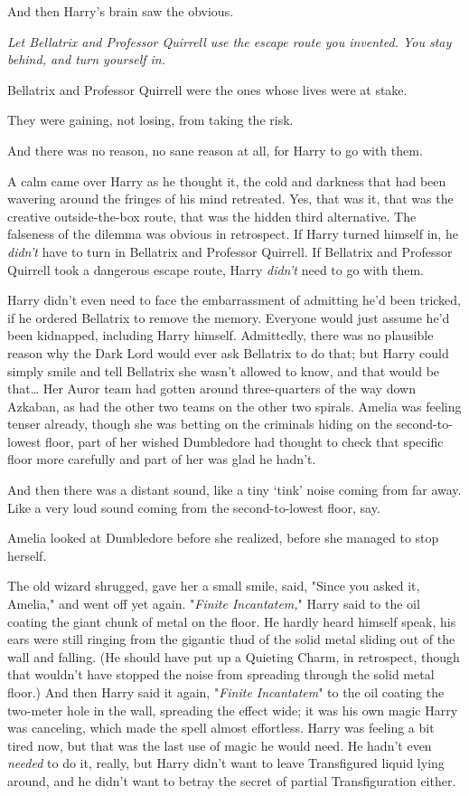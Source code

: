 And then Harry's brain saw the obvious.

\emph{Let Bellatrix and Professor Quirrell use the escape route you invented.
You stay behind, and turn yourself in.}

Bellatrix and Professor Quirrell were the ones whose lives were at stake.

They were gaining, not losing, from taking the risk.

And there was no reason, no sane reason at all, for Harry to go with them.

A calm came over Harry as he thought it, the cold and darkness that had been
wavering around the fringes of his mind retreated. Yes, that was it, that was
the creative outside-the-box route, that was the hidden third alternative. The
falseness of the dilemma was obvious in retrospect. If Harry turned himself in,
he \emph{didn't} have to turn in Bellatrix and Professor Quirrell. If Bellatrix
and Professor Quirrell took a dangerous escape route, Harry \emph{didn't} need
to go with them.

Harry didn't even need to face the embarrassment of admitting he'd been
tricked, if he ordered Bellatrix to remove the memory. Everyone would just
assume he'd been kidnapped, including Harry himself. Admittedly, there was no
plausible reason why the Dark Lord would ever ask Bellatrix to do that; but
Harry could simply smile and tell Bellatrix she wasn't allowed to know, and
that would be that{\ldots}
\later
Her Auror team had gotten around three-quarters of the way down Azkaban, as had
the other two teams on the other two spirals. Amelia was feeling tenser
already, though she was betting on the criminals hiding on the second-to-lowest
floor, part of her wished Dumbledore had thought to check that specific floor
more carefully and part of her was glad he hadn't.

And then there was a distant sound, like a tiny `tink' noise coming from far
away. Like a very loud sound coming from the second-to-lowest floor, say.

Amelia looked at Dumbledore before she realized, before she managed to stop
herself.

The old wizard shrugged, gave her a small smile, said, "Since you asked it,
Amelia," and went off yet again.
\later
"\emph{Finite Incantatem,}" Harry said to the oil coating the giant chunk of
metal on the floor. He hardly heard himself speak, his ears were still ringing
from the gigantic thud of the solid metal sliding out of the wall and falling.
(He should have put up a Quieting Charm, in retrospect, though that wouldn't
have stopped the noise from spreading through the solid metal floor.) And then
Harry said it again, "\emph{Finite Incantatem}" to the oil coating the
two-meter hole in the wall, spreading the effect wide; it was his own magic
Harry was canceling, which made the spell almost effortless. Harry was feeling
a bit tired now, but that was the last use of magic he would need. He hadn't
even \emph{needed} to do it, really, but Harry didn't want to leave
Transfigured liquid lying around, and he didn't want to betray the secret of
partial Transfiguration either.


